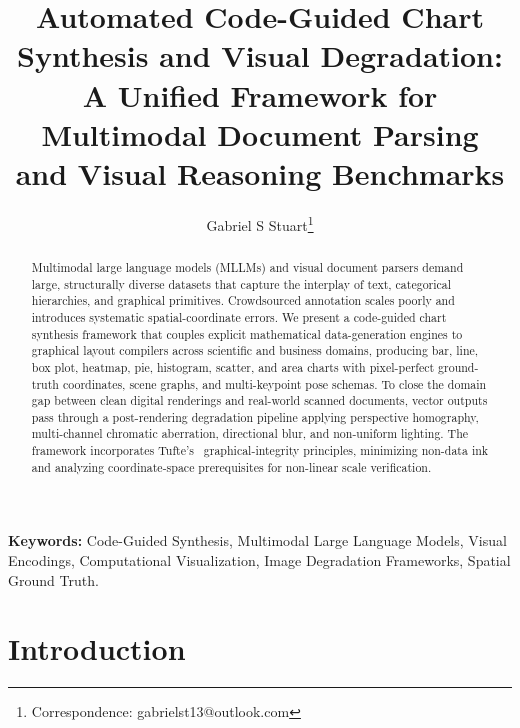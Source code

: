 \documentclass[11pt,twocolumn]{article}
\title{Automated Code-Guided Chart Synthesis and Visual Degradation:\\
A Unified Framework for Multimodal Document Parsing\\
and Visual Reasoning Benchmarks}
\author{
  Gabriel S Stuart\thanks{Correspondence: gabrielst13@outlook.com}
}
\date{}
\begin{document}
\maketitle

\begin{abstract}
Multimodal large language models (MLLMs) and visual document parsers demand large, structurally diverse datasets that capture the interplay of text, categorical hierarchies, and graphical primitives.
Crowdsourced annotation scales poorly and introduces systematic spatial-coordinate errors.
We present a code-guided chart synthesis framework that couples explicit mathematical data-generation engines to graphical layout compilers across scientific and business domains, producing bar, line, box plot, heatmap, pie, histogram, scatter, and area charts with pixel-perfect ground-truth coordinates, scene graphs, and multi-keypoint pose schemas.
To close the domain gap between clean digital renderings and real-world scanned documents, vector outputs pass through a post-rendering degradation pipeline applying perspective homography, multi-channel chromatic aberration, directional blur, and non-uniform lighting.
The framework incorporates Tufte's~\cite{tufte2001} graphical-integrity principles, minimizing non-data ink and analyzing coordinate-space prerequisites for non-linear scale verification.
\end{abstract}

\smallskip
\noindent\textbf{Keywords:} Code-Guided Synthesis, Multimodal Large Language Models, Visual Encodings, Computational Visualization, Image Degradation Frameworks, Spatial Ground Truth.

\section{Introduction}\label{sec:intro}
\end{document}
